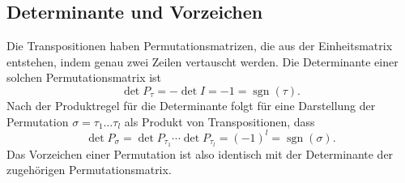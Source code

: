 \subsection{Determinante und Vorzeichen}
Die Transpositionen haben Permutationsmatrizen, die aus der Einheitsmatrix
%
%
entstehen, indem genau zwei Zeilen vertauscht werden.
Die Determinante einer solchen Permutationsmatrix ist
\[
\det P_{\tau} = - \det I = -1 = \operatorname{sgn}(\tau).
\]
Nach der Produktregel für die Determinante folgt für eine Darstellung
der Permutation $\sigma=\tau_1\dots\tau_l$ als Produkt von Transpositionen,
dass
\begin{equation}
\det P_{\sigma}
=
\det P_{\tau_1} \cdots \det P_{\tau_l}
=
(-1)^l
=
\operatorname{sgn}(\sigma).
\label{buch:permutationen:determinante}
\end{equation}
Das Vorzeichen einer Permutation ist also identisch mit der Determinante
der zugehörigen Permutationsmatrix.



